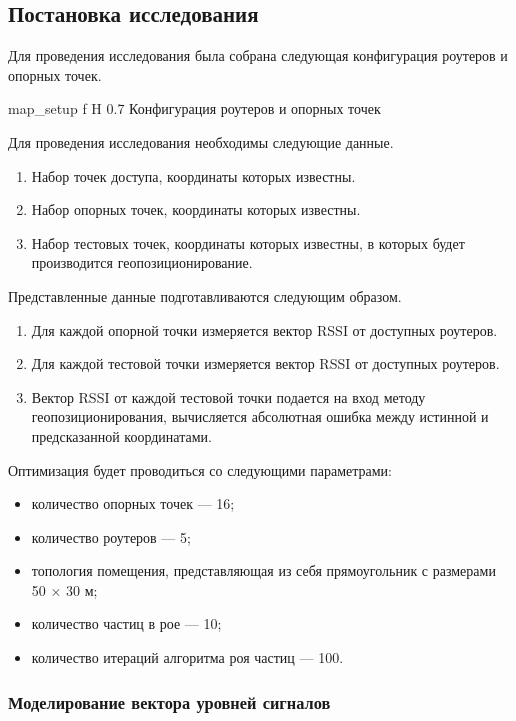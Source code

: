\subsection{Постановка исследования}

Для проведения исследования была собрана следующая конфигурация роутеров и опорных точек.

    {map_setup}
    {f}
    {H}
    {0.7\linewidth}
    {Конфигурация роутеров и опорных точек}

Для проведения исследования необходимы следующие данные.

\begin{enumerate}
    \item Набор точек доступа, координаты которых известны.
    \item Набор опорных точек, координаты которых известны.
    \item Набор тестовых точек, координаты которых известны, в которых будет производится геопозиционирование.
\end{enumerate}

Представленные данные подготавливаются следующим образом.
\begin{enumerate}
    \item Для каждой опорной точки измеряется вектор RSSI от доступных роутеров.
    \item Для каждой тестовой точки измеряется вектор RSSI от доступных роутеров.
    \item Вектор RSSI от каждой тестовой точки подается на вход методу геопозиционирования, вычисляется абсолютная ошибка между истинной и предсказанной координатами.
\end{enumerate}

Оптимизация будет проводиться со следующими параметрами:
\begin{itemize}[label=---,left=0.49cm]
    \item количество опорных точек --- 16;
    \item количество роутеров --- 5;
    \item топология помещения, представляющая из себя прямоугольник с размерами 50 $\times$ 30 м;
    \item количество частиц в рое --- 10;
    \item количество итераций алгоритма роя частиц --- 100.
\end{itemize}

\subsubsection{Моделирование вектора уровней сигналов}

